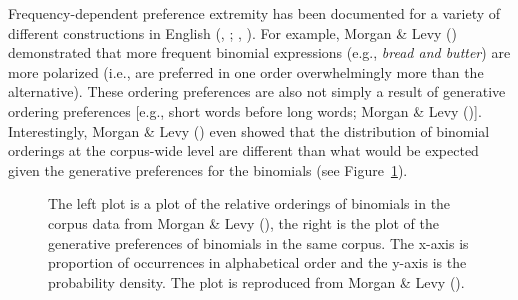 \documentclass[
  12pt,
  letterpaper,
]{scrreprt}
\begin{document}
Frequency-dependent preference extremity has been documented for a
variety of different constructions in English
(,
;
,
).
For example, Morgan \& Levy ()
demonstrated that more frequent binomial expressions (e.g.,
\emph{bread and butter}) are more polarized (i.e., are preferred in one
order overwhelmingly more than the alternative). These ordering
preferences are also not simply a result of generative ordering
preferences {[}e.g., short words before long words; Morgan \& Levy
(){]}.
Interestingly, Morgan \& Levy
()
even showed that the distribution of binomial orderings at the
corpus-wide level are different than what would be expected given the
generative preferences for the binomials (see
Figure~\ref{fig-corpusplot1}).

\begin{figure}[htbp]

\caption{\label{fig-corpusplot1}The left plot is a plot of the relative
orderings of binomials in the corpus data from Morgan \& Levy
(), the right is the plot of the
generative preferences of binomials in the same corpus. The x-axis is
proportion of occurrences in alphabetical order and the y-axis is the
probability density. The plot is reproduced from Morgan \& Levy
().}


\end{figure}%
\end{document}
